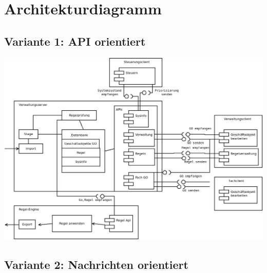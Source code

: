 \chapter{Architekturdiagramm}

\section{Variante 1: API orientiert}

\includegraphics[width=\textwidth]{EISWS1516Howe_MS2_Architektur_api.png}

\section{Variante 2: Nachrichten orientiert}



